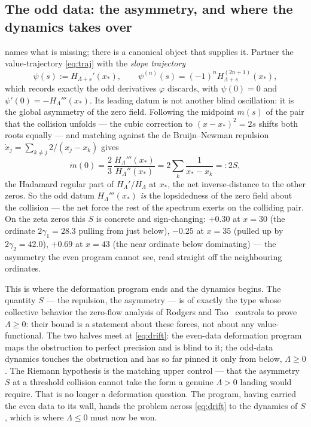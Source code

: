 \documentclass[11pt,reqno]{amsart}
\theoremstyle{plain}
\theoremstyle{definition}
\theoremstyle{remark}
\begin{document}
\subsection{The odd data: the asymmetry, and where the dynamics takes over}
\label{subsec:odd}
 names what is missing; there is a canonical object that
supplies it. Partner the value-trajectory \eqref{eq:traj} with the
\emph{slope trajectory}
\begin{equation}\label{eq:slopetraj}
  \psi(s):=H_{\Lambda+s}'(x_*),\qquad
  \psi^{(n)}(s)=(-1)^nH_{\Lambda+s}^{(2n+1)}(x_*),
\end{equation}
which records exactly the odd derivatives $\varphi$ discards, with $\psi(0)=0$
and $\psi'(0)=-H_\Lambda'''(x_*)$. Its leading datum is not another blind
oscillation: it is the global asymmetry of the zero field. Following the
midpoint $m(s)$ of the pair that the collision unfolds --- the cubic
correction to $(x-x_*)^2=2s$ shifts both roots equally --- and matching
against the de Bruijn--Newman repulsion $\dot x_j=\sum_{k\ne j}2/(x_j-x_k)$
gives
\begin{equation}\label{eq:drift}
  \dot m(0)=\frac{2}{3}\,\frac{H_\Lambda'''(x_*)}{H_\Lambda''(x_*)}
  =2\sum_{k}\frac{1}{x_*-x_k}=:2S,
\end{equation}
the Hadamard regular part of $H_\Lambda'/H_\Lambda$ at $x_*$, the net
inverse-distance to the other zeros. So the odd datum $H_\Lambda'''(x_*)$
\emph{is} the lopsidedness of the zero field about the collision --- the net
force the rest of the spectrum exerts on the colliding pair. On the zeta
zeros this $S$ is concrete and sign-changing: $+0.30$ at $x=30$ (the ordinate
$2\gamma_1=28.3$ pulling from just below), $-0.25$ at $x=35$ (pulled up by
$2\gamma_2=42.0$), $+0.69$ at $x=43$ (the near ordinate below dominating) ---
the asymmetry the even program cannot see, read straight off the neighbouring
ordinates.

This is where the deformation program ends and the dynamics begins. The
quantity $S$ --- the repulsion, the asymmetry --- is of exactly the type
whose collective behavior the zero-flow analysis of Rodgers and
Tao~\cite{RodgersTao} controls to prove $\Lambda\ge0$: their bound is a
statement about these forces, not about any value-functional. The two halves
meet at \eqref{eq:drift}: the even-data deformation program maps the
obstruction to perfect precision and is blind to it; the odd-data dynamics
touches the obstruction and has so far pinned it only from below,
$\Lambda\ge0$. The Riemann hypothesis is the matching upper control --- that
the asymmetry $S$ at a threshold collision cannot take the form a genuine
$\Lambda>0$ landing would require. That is no longer a deformation question.
The program, having carried the even data to its wall, hands the problem
across \eqref{eq:drift} to the dynamics of $S$, which is where $\Lambda\le0$
must now be won.
\end{document}
